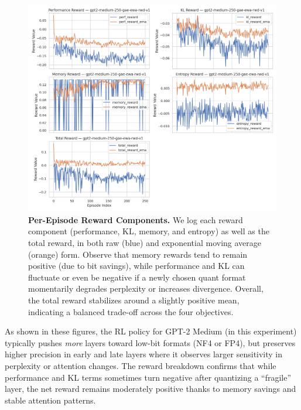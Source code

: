 \documentclass{article}
\begin{document}
	\begin{figure}[ht]
		
		\centering
		\includegraphics[width=1.0\columnwidth]{gpt2-medium-250-gae-ewa-rwd-v1_reward_subplots.png}
		\vspace{-1em}
		\caption{\small
			\textbf{Per-Episode Reward Components.}
			We log each reward component (performance, KL, memory, and entropy) as well as the total reward, in both raw (blue) and exponential moving average (orange) form. 
			Observe that memory rewards tend to remain positive (due to bit savings), while performance and KL can fluctuate or even be negative if a newly chosen quant format momentarily degrades perplexity or increases divergence. 
			Overall, the total reward stabilizes around a slightly positive mean, indicating a balanced trade-off across the four objectives.
		}
		\label{fig:gpt2medium-rewards}
	\end{figure}
	
	\vspace{1em}
	\noindent
	As shown in these figures, the RL policy for GPT-2 Medium (in this experiment) typically pushes \emph{more} layers toward low-bit formats (NF4 or FP4), but preserves higher precision in early and late layers where it observes larger sensitivity in perplexity or attention changes. 
	The reward breakdown confirms that while performance and KL terms sometimes turn negative after quantizing a “fragile” layer, the net reward remains moderately positive thanks to memory savings and stable attention patterns.
				
				
	
\end{document}
